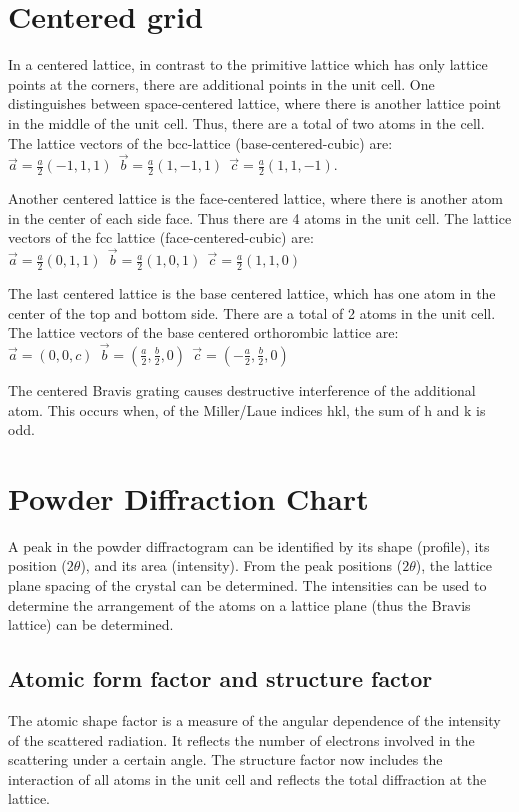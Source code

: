 \section{Centered grid}
In a centered lattice, in contrast to the primitive lattice which has only lattice points at the corners, there are additional points in the unit cell. One distinguishes between space-centered lattice, where there is another lattice point in the middle of the unit cell. Thus, there are a total of two atoms in the cell. The lattice vectors of the bcc-lattice (base-centered-cubic) are: $\vec{a}=\frac{a}{2}\left(-1,1,1\right)\:\:\vec{b}=\frac{a}{2}\left(1,-1,1\right)\:\:\vec{c}=\frac{a}{2}\left(1,1,-1\right)$. 

Another centered lattice is the face-centered lattice, where there is another atom in the center of each side face. Thus there are 4 atoms in the unit cell. The lattice vectors of the fcc lattice (face-centered-cubic) are: $\vec{a}=\frac{a}{2}\left(0,1,1\right)\:\:\vec{b}=\frac{a}{2}\left(1,0,1\right)\:\:\vec{c}=\frac{a}{2}\left(1,1,0\right)$

The last centered lattice is the base centered lattice, which has one atom in the center of the top and bottom side. There are a total of 2 atoms in the unit cell. The lattice vectors of the base centered orthorombic lattice are: $\vec{a}=\left(0,0,c\right)\:\:\vec{b}=\left(\frac{a}{2},\frac{b}{2},0\right)\:\:\vec{c}=\left(-\frac{a}{2},\frac{b}{2},0\right)$

The centered Bravis grating causes destructive interference of the additional atom. This occurs when, of the Miller/Laue indices hkl, the sum of h and k is odd.

\section{Powder Diffraction Chart}
A peak in the powder diffractogram can be identified by its
shape (profile), its position ($2\theta$), and its area
(intensity).
From the peak positions ($2\theta$), the lattice plane spacing of the crystal can be determined.
The intensities can be used to determine the arrangement of the atoms on a lattice plane (thus the Bravis lattice) can be determined.

\subsection{Atomic form factor and structure factor}
The atomic shape factor is a measure of the angular dependence of the intensity of the scattered radiation. It reflects the number of electrons involved in the scattering under a certain angle. The structure factor now includes the interaction of all atoms in the unit cell and reflects the total diffraction at the lattice.

